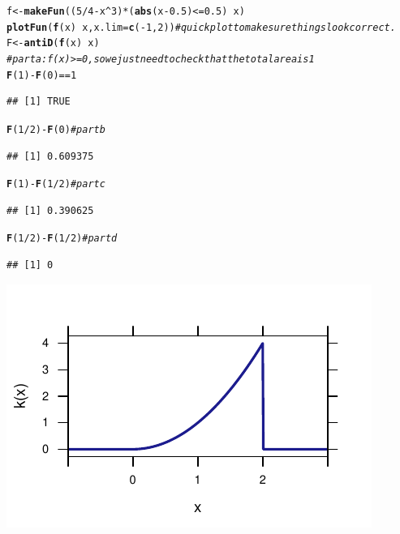 \documentclass[twoside]{book}\usepackage[]{graphicx}\usepackage[]{xcolor}
\makeatletter
\def\maxwidth{ %
  \ifdim\Gin@nat@width>\linewidth
    \linewidth
  \else
    \Gin@nat@width
  \fi
}
\newcommand{\hlnum}[1]{\textcolor[rgb]{0.686,0.059,0.569}{#1}}%
\newcommand{\hlcom}[1]{\textcolor[rgb]{0.678,0.584,0.686}{\textit{#1}}}%
\newcommand{\hlopt}[1]{\textcolor[rgb]{0,0,0}{#1}}%
\newcommand{\hlstd}[1]{\textcolor[rgb]{0.345,0.345,0.345}{#1}}%
\newcommand{\hlkwb}[1]{\textcolor[rgb]{0.69,0.353,0.396}{#1}}%
\newcommand{\hlkwc}[1]{\textcolor[rgb]{0.333,0.667,0.333}{#1}}%
\newcommand{\hlkwd}[1]{\textcolor[rgb]{0.737,0.353,0.396}{\textbf{#1}}}%
\newenvironment{kframe}{%
 \def\at@end@of@kframe{}%
 \ifinner\ifhmode%
  \def\at@end@of@kframe{\end{minipage}}%
  \begin{minipage}{\columnwidth}%
 \fi\fi%
 \def\FrameCommand##1{\hskip\@totalleftmargin \hskip-\fboxsep
 \colorbox{shadecolor}{##1}\hskip-\fboxsep
     \hskip-\linewidth \hskip-\@totalleftmargin \hskip\columnwidth}%
 \MakeFramed {\advance\hsize-\width
   \@totalleftmargin\z@ \linewidth\hsize
   \@setminipage}}%
 {\par\unskip\endMakeFramed%
 \at@end@of@kframe}
\newenvironment{knitrout}{}{} %
\makeatother
\begin{document}
\begin{solution}
\begin{knitrout}
\color{fgcolor}\begin{kframe}
\begin{alltt}
\hlstd{f} \hlkwb{<-} \hlkwd{makeFun}\hlstd{((}\hlnum{5}\hlopt{/}\hlnum{4} \hlopt{-} \hlstd{x}\hlopt{^}\hlnum{3}\hlstd{)} \hlopt{*} \hlstd{(}\hlkwd{abs}\hlstd{(x} \hlopt{-} \hlnum{0.5}\hlstd{)} \hlopt{<=} \hlnum{0.5}\hlstd{)} \hlopt{~} \hlstd{x)}
\hlkwd{plotFun}\hlstd{(}\hlkwd{f}\hlstd{(x)} \hlopt{~} \hlstd{x,} \hlkwc{x.lim} \hlstd{=} \hlkwd{c}\hlstd{(}\hlopt{-}\hlnum{1}\hlstd{,} \hlnum{2}\hlstd{))}  \hlcom{# quick plot to make sure things look correct.}
\hlstd{F} \hlkwb{<-} \hlkwd{antiD}\hlstd{(}\hlkwd{f}\hlstd{(x)} \hlopt{~} \hlstd{x)}
\hlcom{# part a: f(x) >=0, so we just need to check that the total area is 1}
\hlkwd{F}\hlstd{(}\hlnum{1}\hlstd{)} \hlopt{-} \hlkwd{F}\hlstd{(}\hlnum{0}\hlstd{)} \hlopt{==} \hlnum{1}
\end{alltt}
\begin{verbatim}
## [1] TRUE
\end{verbatim}
\begin{alltt}
\hlkwd{F}\hlstd{(}\hlnum{1}\hlopt{/}\hlnum{2}\hlstd{)} \hlopt{-} \hlkwd{F}\hlstd{(}\hlnum{0}\hlstd{)}  \hlcom{# part b}
\end{alltt}
\begin{verbatim}
## [1] 0.609375
\end{verbatim}
\begin{alltt}
\hlkwd{F}\hlstd{(}\hlnum{1}\hlstd{)} \hlopt{-} \hlkwd{F}\hlstd{(}\hlnum{1}\hlopt{/}\hlnum{2}\hlstd{)}  \hlcom{# part c}
\end{alltt}
\begin{verbatim}
## [1] 0.390625
\end{verbatim}
\begin{alltt}
\hlkwd{F}\hlstd{(}\hlnum{1}\hlopt{/}\hlnum{2}\hlstd{)} \hlopt{-} \hlkwd{F}\hlstd{(}\hlnum{1}\hlopt{/}\hlnum{2}\hlstd{)}  \hlcom{# part d}
\end{alltt}
\begin{verbatim}
## [1] 0
\end{verbatim}
\end{kframe}

{\centering \includegraphics[width=\maxwidth]{figures/fig-unnamed-chunk-68-1} 

}
\end{knitrout}
\end{solution}
\end{document}
